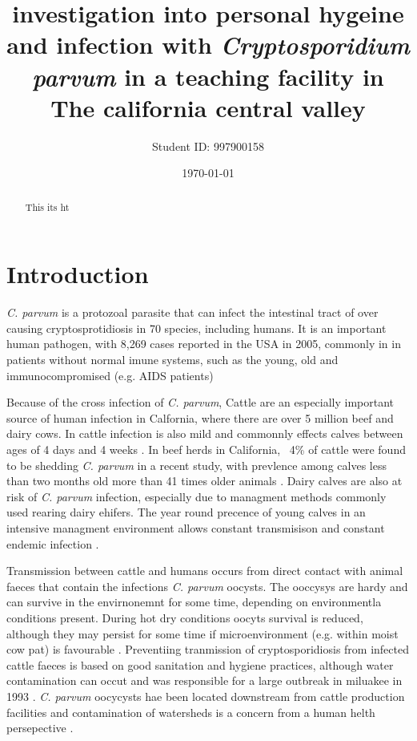 \documentclass[12pt]{article}
\title{investigation into personal hygeine and infection with \emph{Cryptosporidium parvum} in a teaching facility in The california central valley}
\author{Student ID: 997900158}
\date{\today}
\begin{document}
	\maketitle
	\begin{abstract}
		This its ht 

	\end{abstract}

\doublespacing
	\section{Introduction} 
	\emph{C. parvum} is a protozoal parasite that can infect the intestinal tract of over causing cryptosprotidiosis in  70 species, \cite{Casemore1997} including humans.
	It is an important human pathogen, with 8,269 cases reported in the USA in 2005, commonly in in patients without normal imune systems, such as the young, old and immunocompromised (e.g. AIDS patients) \cite{Yoder2007}


	Because of the cross infection of \emph{C. parvum}, Cattle are an especially important source of human infection in Calfornia, where there are over 5 million beef and dairy cows. \cite{WesternFarm}
	In cattle infection is also mild and commonnly effects calves between ages of 4 days and 4 weeks \cite{malmo2010}. 
	In beef herds in California, ~4\% of cattle were found to be shedding \emph{C. parvum} in a recent study, with prevlence among calves less than two months old more than 41 times older animals \cite{Atwill1999a}.
	Dairy calves are also at risk of \emph{C. parvum} infection, especially due to managment methods commonly used rearing dairy ehifers. The year round precence of young calves in an intensive managment environment allows constant transmisison and constant endemic infection .\cite{Atwill1998}
	
	
	Transmission between cattle and humans occurs from direct contact with animal faeces that contain the infections \emph{C. parvum} oocysts\cite{malmo2010}.
	The ooccysys are hardy and can survive in the envirnonemnt for some time, depending on environmentla conditions present. 
	During hot dry conditions oocyts survival is reduced, although they may persist for some time if microenvironment (e.g. within moist cow pat) is favourable \cite{Robertson1992}.
	Preventiing tranmission of cryptosporidiosis from infected cattle faeces is based on good sanitation and hygiene practices\cite{malmo2010}, although water contamination can occut and was responsible for a large outbreak in miluakee in 1993 \cite{Kenzie1994}. 
	\emph{C. parvum} oocycysts hae been located downstream from cattle production facilities and contamination of watersheds is a concern from a human helth persepective \cite{Ong1996}. 
\end{document}
